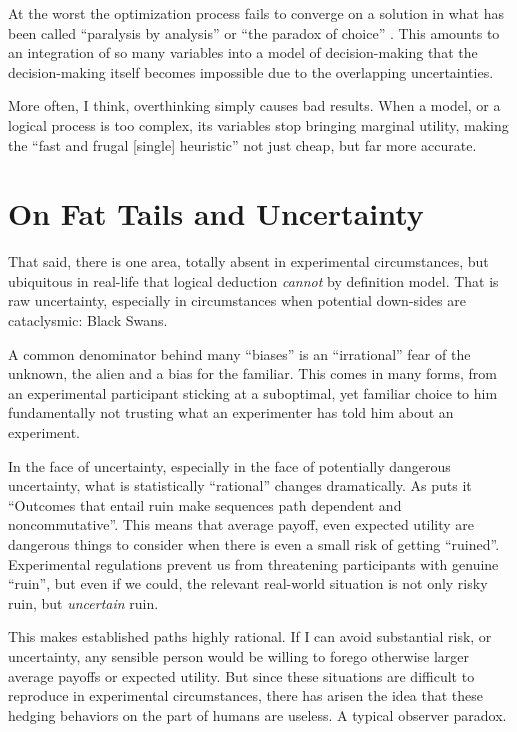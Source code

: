 \documentclass{article}
\begin{document}
At the worst the optimization process fails to converge on a solution in what has been called ``paralysis by analysis'' or ``the paradox of choice'' \parencite{schwartz04}.
This amounts to an integration of so many variables into a model of decision-making that the decision-making itself becomes impossible due to the overlapping uncertainties.

More often, I think, overthinking simply causes bad results.
When a model, or a logical process is too complex, its variables stop bringing marginal utility, making the ``fast and frugal [single] heuristic'' not just cheap, but far more accurate.


\section{On Fat Tails and Uncertainty\label{tails}}

That said, there is one area, totally absent in experimental circumstances, but ubiquitous in real-life that logical deduction \emph{cannot} by definition model.
That is raw uncertainty, especially in circumstances when potential down-sides are cataclysmic: Black Swans.

A common denominator behind many ``biases'' is an ``irrational'' fear of the unknown, the alien and a bias for the familiar.
This comes in many forms, from an experimental participant sticking at a suboptimal, yet familiar choice to him fundamentally not trusting what an experimenter has told him about an experiment.

In the face of uncertainty, especially in the face of potentially dangerous uncertainty, what is statistically ``rational'' changes dramatically.
As \textcite{taleb18} puts it ``Outcomes that entail ruin make sequences path dependent and noncommutative''.
This means that average payoff, even expected utility are dangerous things to consider when there is even a small risk of getting ``ruined''.
Experimental regulations prevent us from threatening participants with genuine ``ruin'', but even if we could, the relevant real-world situation is not only risky ruin, but \emph{uncertain} ruin.

This makes established paths highly rational.
If I can avoid substantial risk, or uncertainty, any sensible person would be willing to forego otherwise larger average payoffs or expected utility.
But since these situations are difficult to reproduce in experimental circumstances, there has arisen the idea that these hedging behaviors on the part of humans are useless.
A typical observer paradox.
\end{document}
